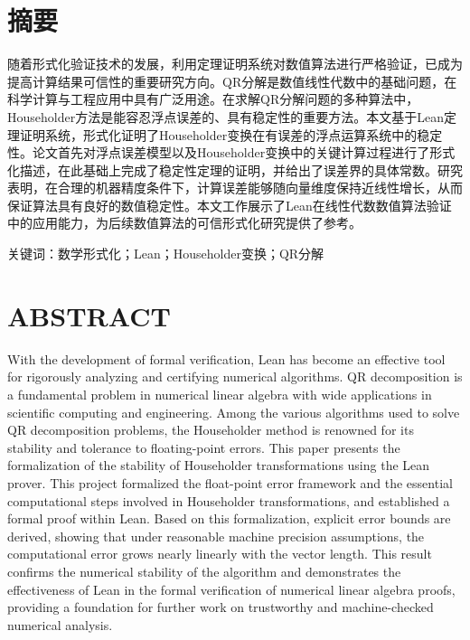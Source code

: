 ﻿\documentclass[UTF8,a4paper,openany]{ctexbook}
\theoremstyle{qrplain}
\begin{document}


\chapter*{摘要}

随着形式化验证技术的发展，利用定理证明系统对数值算法进行严格验证，已成为提高计算结果可信性的重要研究方向。QR分解是数值线性代数中的基础问题，在科学计算与工程应用中具有广泛用途。在求解QR分解问题的多种算法中，Householder方法是能容忍浮点误差的、具有稳定性的重要方法。本文基于Lean定理证明系统，形式化证明了Householder变换在有误差的浮点运算系统中的稳定性。论文首先对浮点误差模型以及Householder变换中的关键计算过程进行了形式化描述，在此基础上完成了稳定性定理的证明，并给出了误差界的具体常数。研究表明，在合理的机器精度条件下，计算误差能够随向量维度保持近线性增长，从而保证算法具有良好的数值稳定性。本文工作展示了Lean在线性代数数值算法验证中的应用能力，为后续数值算法的可信形式化研究提供了参考。

\vspace{\baselineskip}

关键词：数学形式化；Lean；Householder变换；QR分解

\chapter*{ABSTRACT}

With the development of formal verification, Lean has become an effective tool for rigorously analyzing and certifying numerical algorithms. QR decomposition is a fundamental problem in numerical linear algebra with wide applications in scientific computing and engineering. Among the various algorithms used to solve QR decomposition problems, the Householder method is renowned for its stability and tolerance to floating-point errors. This paper presents the formalization of the stability of Householder transformations using the Lean prover. This project formalized the float-point error framework and the essential computational steps involved in Householder transformations, and established a formal proof within Lean. Based on this formalization, explicit error bounds are derived, showing that under reasonable machine precision assumptions, the computational error grows nearly linearly with the vector length. This result confirms the numerical stability of the algorithm and demonstrates the effectiveness of Lean in the formal verification of numerical linear algebra proofs, providing a foundation for further work on trustworthy and machine-checked numerical analysis.
\end{document}
